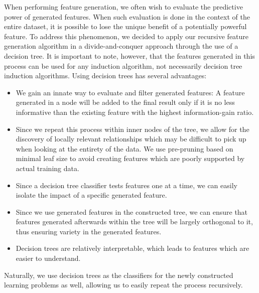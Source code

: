 \documentclass{article}
\theoremstyle{definition}
\begin{document}
When performing feature generation, we often wish to evaluate the predictive power of generated features. When such evaluation is done in the context of the entire dataset, it is possible to lose the unique benefit of a potentially powerful feature. To address this phenomenon, we decided to apply our recursive feature generation algorithm in a divide-and-conquer approach through the use of a decision tree. It is important to note, however, that the features generated in this process can be used for any induction algorithm, not necessarily decision tree induction algorithms.
Using decision trees has several advantages:
\begin{itemize}
	\item We gain an innate way to evaluate and filter generated features: A feature generated in a node will be added to the final result only if it is no less informative than the existing feature with the highest information-gain ratio. %
	\item Since we repeat this process within inner nodes of the tree, we allow for the discovery of locally relevant relationships which may be difficult to pick up when looking at the entirety of the data. We use pre-pruning based on minimal leaf size to avoid creating features which are poorly supported by actual training data.
	\item Since a decision tree classifier tests features one at a time, we can easily isolate the impact of a specific generated feature.
	\item Since we use generated features in the constructed tree, we can ensure that features generated afterwards within the tree will be largely orthogonal to it, thus ensuring variety in the generated features. %
	\item Decision trees are relatively interpretable, which leads to features which are easier to understand.
\end{itemize}
Naturally, we use decision trees as the classifiers for the newly constructed learning problems as well, allowing us to easily repeat the process recursively. %
\end{document}
